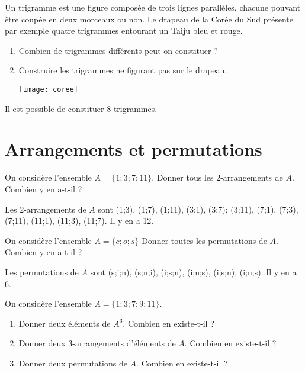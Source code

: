 \documentclass[11pt,fleqn, openany]{book} %
\begin{document}
\begin{exercise}[topic=comb01]Un trigramme est une figure composée de trois lignes parallèles, chacune pouvant être coupée en deux morceaux ou non. Le drapeau de la Corée du Sud présente par exemple quatre trigrammes entourant un Taiju bleu et rouge.
\begin{enumerate}
\item Combien de trigrammes différents peut-on constituer ?

\item Construire les trigrammes ne figurant pas sur le drapeau.

\begin{center}
\texttt{[image: coree]}
\end{center}
\end{enumerate}
\end{exercise}

\begin{solution}Il est possible de constituer 8 trigrammes. \end{solution}



\section*{Arrangements et permutations}

\begin{exercise}[topic=comb02]On considère l'ensemble $A=\{1;3;7;11\}$. Donner tous les 2-arrangements de $A$. Combien y en a-t-il ?\end{exercise}

\begin{solution}Les 2-arrangements de $A$ sont (1;3), (1;7), (1;11), (3;1), (3;7); (3;11), (7;1), (7;3), (7;11), (11;1), (11;3), (11;7). Il y en a 12.\end{solution}



\begin{exercise}[topic=comb02]On considère l'ensemble $A=\{c;o;s\}$ Donner toutes les permutations de $A$. Combien y en a-t-il ?\end{exercise}

\begin{solution}Les permutations de $A$ sont (s;i;n), (s;n;i), (i;s;n), (i;n;s), (i;s;n), (i;n;s). Il y en a 6.\end{solution}




\begin{exercise}[topic=comb02]
On considère l'ensemble $A=\{1;3;7;9;11\}$.
\begin{enumerate}
\item Donner deux éléments de $A^3$. Combien en existe-t-il ?
\item Donner deux 3-arrangements d'éléments de $A$. Combien en existe-t-il ?
\item Donner deux permutations de $A$. Combien en existe-t-il ?
\end{enumerate}\end{exercise}
\end{document}
